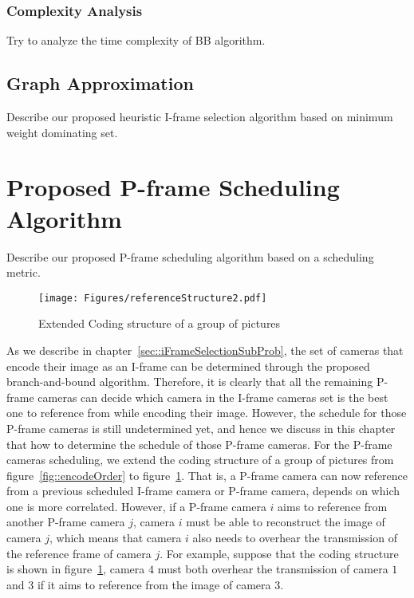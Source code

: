 \subsubsection{Complexity Analysis}

{\color{red}Try to analyze the time complexity of BB algorithm. }
%
\subsection{Graph Approximation}
{\color{red}Describe our proposed heuristic I-frame selection algorithm based on minimum weight dominating set.}
%
%
%
\section{Proposed P-frame Scheduling Algorithm}
{\color{red}Describe our proposed P-frame scheduling algorithm based on a scheduling metric.}
%
\begin{figure}
\begin{center}
\texttt{[image: Figures/referenceStructure2.pdf]}
\caption{\label{fig::encodeOrder2}Extended Coding structure of a group of pictures}
\end{center}
\end{figure}
%
As we describe in chapter~\ref{sec::iFrameSelectionSubProb}, the set of cameras that encode their image as an I-frame can be determined through the proposed branch-and-bound algorithm.
Therefore, it is clearly that all the remaining P-frame cameras can decide which camera in the I-frame cameras set is the best one to reference from while encoding their image.
However, the schedule for those P-frame cameras is still undetermined yet, and hence we discuss in this chapter that how to determine the schedule of those P-frame cameras.
For the P-frame cameras scheduling, we extend the coding structure of a group of pictures from figure~\ref{fig::encodeOrder} to figure~\ref{fig::encodeOrder2}.
That is, a P-frame camera can now reference from a previous scheduled I-frame camera or P-frame camera, depends on which one is more correlated.
However, if a P-frame camera $i$ aims to reference from another P-frame camera $j$, camera $i$ must be able to reconstruct the image of camera $j$, which means that camera $i$ also needs to overhear the transmission of the reference frame of camera $j$.
For example, suppose that the coding structure is shown in figure~\ref{fig::encodeOrder2}, camera $4$ must both overhear the transmission of camera $1$ and $3$ if it aims to reference from the image of camera $3$.
%